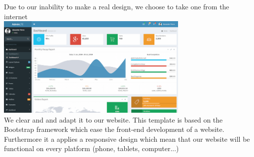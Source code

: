 Due to our inability to make a real design, we choose to take one from the internet
\\
\includegraphics[width=0.70\textwidth]{img/design.png}
\\
We clear and and adapt it to our website.
This template is based on the Bootstrap framework which ease the front-end development of a website. Furthermore it a applies a responsive design which mean that our website will be functional on every platform (phone, tablets, computer...)









